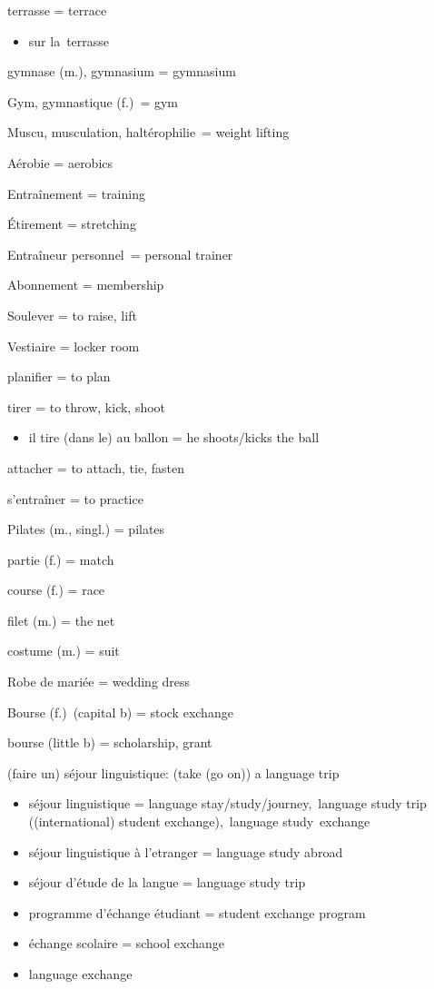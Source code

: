terrasse = terrace

\begin{itemize}
\item
  {sur} la~terrasse
\end{itemize}

gymnase (m.), gymnasium = gymnasium

Gym, gymnastique (f.)~= gym

Muscu, musculation, haltérophilie~= weight lifting~

Aérobie = aerobics~

Entraînement = training

Étirement = stretching~

Entraîneur personnel~= personal trainer

Abonnement = membership~

Soulever = to raise, lift

Vestiaire = locker room~

planifier = to plan

tirer = to throw, kick, shoot

\begin{itemize}
\item
  il tire ({dans} le) au ballon = he shoots/kicks the ball
\end{itemize}

attacher = to attach, tie, fasten

s'entraîner = to practice

Pilates (m., singl.) = pilates~

partie (f.) = match

course (f.) = race

filet (m.) = the net

costume (m.) = suit

Robe de mariée = wedding dress~

Bourse (f.)~(capital b) = stock exchange~

bourse (little b) = scholarship, grant

(faire un) séjour linguistique: (take (go on)) a language trip

\begin{itemize}
\item
  séjour linguistique = language stay/study/journey,~language study trip
  ((international) student exchange),~language study~exchange
\item
  séjour linguistique à l'etranger = language study abroad
\item
  séjour d'étude de la langue = language study trip
\item
  programme d'échange étudiant = student exchange program
\item
  échange scolaire = school exchange
\item
  language exchange
\end{itemize}

